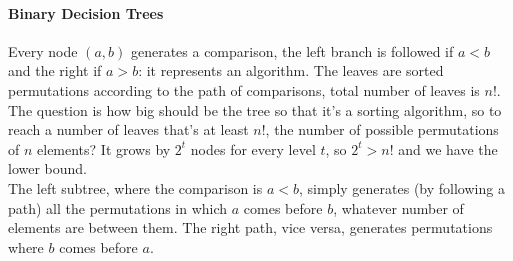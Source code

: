 \documentclass[10pt]{report}
\begin{document}
\paragraph{Binary Decision Trees} Every node $(a,b)$ generates a comparison, the left branch is followed if $a<b$ and the right if $a>b$: it represents an algorithm. The leaves are sorted permutations according to the path of comparisons, total number of leaves is $n!$. The question is how big should be the tree so that it's a sorting algorithm, so to reach a number of leaves that's at least $n!$, the number of possible permutations of $n$ elements? It grows by $2^t$ nodes for every level $t$, so $2^t > n!$ and we have the lower bound.\\
The left subtree, where the comparison is $a < b$, simply generates (by following a path) all the permutations in which $a$ comes before $b$, whatever number of elements are between them. The right path, vice versa, generates permutations where $b$ comes before $a$.
\end{document}
